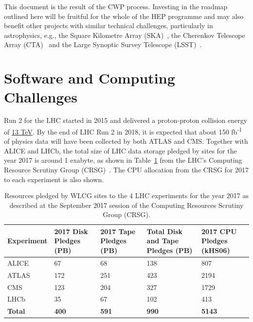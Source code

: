\documentclass[twocolumn]{svjour3}          %
\begin{document}
This document is the result of the CWP process. Investing in the roadmap
outlined here will be fruitful for the whole of the HEP programme and
may also benefit other projects with similar technical challenges,
particularly in astrophysics, e.g., the Square Kilometre Array (SKA)~\cite{SKA},
the Cherenkov Telescope Array (CTA)~\cite{CTA} and the Large Synoptic Survey
Telescope (LSST)~\cite{LSST}.

\hypertarget{software-and-computing-challenges}{%
\section{Software and Computing
Challenges}\label{software-and-computing-challenges}}

Run 2 for the LHC started in 2015 and delivered a proton-proton
collision energy of
\href{http://home.cern/about/engineering/restarting-lhc-why-13-tev}{13
TeV}. By the end of LHC Run 2 in 2018, it is expected that about 150
fb\textsuperscript{-1} of physics data will have been collected by both
ATLAS and CMS. Together with ALICE and LHCb, the total size of LHC data
storage pledged by sites for the year 2017 is around 1 exabyte, as shown
in Table~\ref{tab:crsg2017} from the LHC's Computing Resource Scrutiny Group
(CRSG)~\cite{Lucchesi:2284575}. The CPU allocation from the CRSG for 2017 to each
experiment is also shown.

\begin{table}
    \centering
\begin{tabular}{lp{}p{}p{}p{}}
\hline
\textbf{Experiment} & \textbf{2017 Disk Pledges (PB)} & \textbf{2017 Tape Pledges (PB)} & \textbf{Total Disk and Tape Pledges (PB)} & \textbf{2017 CPU Pledges (kHS06)}\\
\hline
ALICE & 67 & 68 & 138 & 807\\
ATLAS & 172 & 251 & 423 & 2194\\
CMS & 123 & 204 & 327 & 1729\\
LHCb & 35 & 67 & 102 & 413\\
\textbf{Total} & \textbf{400} & \textbf{591} & \textbf{990} &
\textbf{5143}\\
\hline
\end{tabular}
    \caption{Resources pledged by WLCG sites to the 4 LHC experiments for
the year 2017 as described at the September 2017 session of the
Computing Resources Scrutiny Group (CRSG).}
    \label{tab:crsg2017}
\end{table}
\end{document}
